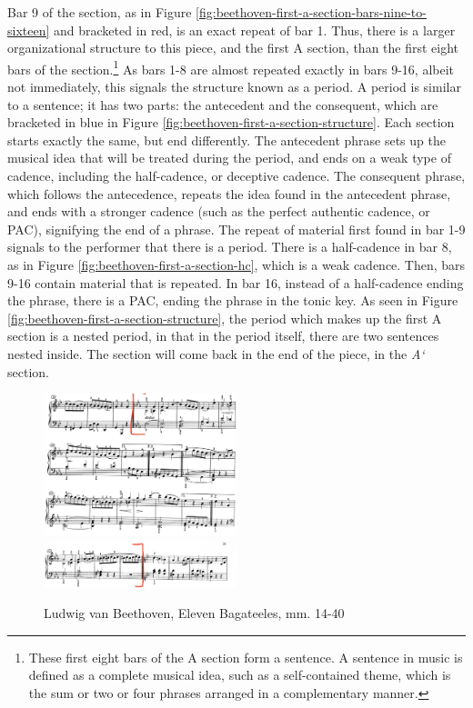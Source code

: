 Bar 9 of the section, as in Figure \ref{fig:beethoven-first-a-section-bars-nine-to-sixteen}\autocite{Henle_1978} and bracketed in red, is an exact repeat of bar 1. Thus, there is a larger organizational structure to this piece, and the first A section, than the first eight bars of the section.\footnote{These first eight bars of the A section form a sentence. A sentence in music is defined as a complete musical idea, such as a self-contained theme, which is the sum or two or four phrases arranged in a complementary manner.} As bars 1-8 are almost repeated exactly in bars 9-16, albeit not immediately, this signals the structure known as a period. A period is similar to a sentence; it has two parts: the antecedent and the consequent, which are bracketed in blue in Figure \ref{fig:beethoven-first-a-section-structure}\autocite{Henle_1978}. Each section starts exactly the same, but end differently. The antecedent phrase sets up the musical idea that will be treated during the period, and ends on a weak type of cadence, including the half-cadence, or deceptive cadence. The consequent phrase, which follows the antecedence, repeats the idea found in the antecedent phrase, and ends with a stronger cadence (such as the perfect authentic cadence, or PAC), signifying the end of a phrase. The repeat of material first found in bar 1-9 signals to the performer that there is a period. There is a half-cadence in bar 8, as in Figure \ref{fig:beethoven-first-a-section-hc}\autocite{Henle_1978}, which is a weak cadence. Then, bars 9-16 contain material that is repeated. In bar 16, instead of a half-cadence ending the phrase, there is a PAC, ending the phrase in the tonic key. As seen in Figure \ref{fig:beethoven-first-a-section-structure}\autocite{Henle_1978}, the period which makes up the first A section is a nested period, in that in the period itself, there are two sentences nested inside. The section will come back in the end of the piece, in the \textit{A`} section. 

\begin{figure}
	\centering
	\includegraphics[width=0.5\textwidth]{figures/beethoven-b-section.jpg}
	\includegraphics[width=0.5\textwidth]{figures/beethoven-b-section-part-two.jpg}
	\caption{Ludwig van Beethoven, Eleven Bagateeles, mm. 14-40}
	\label{fig:beethoven-b-section}
\end{figure}

